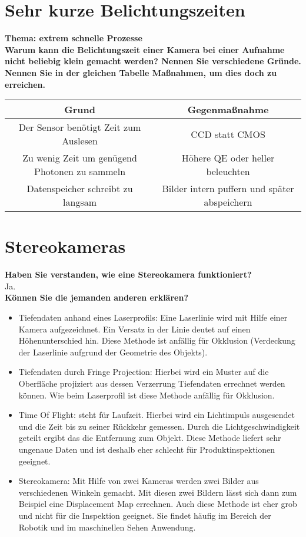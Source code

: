 \documentclass[a4paper]{article}
\begin{document}
	\section{Sehr kurze Belichtungszeiten}
	\textbf{Thema: extrem schnelle Prozesse}\\
	\textbf{Warum kann die Belichtungszeit einer Kamera bei einer Aufnahme nicht beliebig klein
	gemacht werden? Nennen Sie verschiedene Gründe. Nennen Sie in der gleichen Tabelle
	Maßnahmen, um dies doch zu erreichen.}
	\begin{center}
		\begin{tabular}{ c|c }
			Grund & Gegenmaßnahme \\ 
			\hline
			Der Sensor benötigt Zeit zum Auslesen & CCD statt CMOS \\
			Zu wenig Zeit um genügend Photonen zu sammeln & Höhere QE oder heller beleuchten \\
			Datenspeicher schreibt zu langsam & Bilder intern puffern und später abspeichern
		\end{tabular}
	\end{center}
	
	\newpage
	
	\section{Stereokameras}
	\textbf{Haben Sie verstanden, wie eine Stereokamera funktioniert?}\\
	Ja.\\
	\textbf{Können Sie die jemanden anderen erklären?}
	\begin{itemize}
		\item Tiefendaten anhand eines Laserprofils: Eine Laserlinie wird mit Hilfe einer Kamera aufgezeichnet. Ein Versatz in der Linie deutet auf einen Höhenunterschied hin. Diese Methode ist anfällig für Okklusion (Verdeckung der Laserlinie aufgrund der Geometrie des Objekts).
		\item Tiefendaten durch Fringe Projection: Hierbei wird ein Muster auf die Oberfläche projiziert aus dessen Verzerrung Tiefendaten errechnet werden können. Wie beim Laserprofil ist diese Methode anfällig für Okklusion.
		\item Time Of Flight: steht für Laufzeit. Hierbei wird ein Lichtimpuls ausgesendet und die Zeit bis zu seiner Rückkehr gemessen. Durch die Lichtgeschwindigkeit geteilt ergibt das die Entfernung zum Objekt. Diese Methode liefert sehr ungenaue Daten und ist deshalb eher schlecht für Produktinspektionen geeignet.
		\item Stereokamera: Mit Hilfe von zwei Kameras werden zwei Bilder aus verschiedenen Winkeln gemacht. Mit diesen zwei Bildern lässt sich dann zum Beispiel eine Displacement Map errechnen. Auch diese Methode ist eher grob und nicht für die Inspektion geeignet. Sie findet häufig im Bereich der Robotik und im maschinellen Sehen Anwendung.
	\end{itemize}
	
\end{document}
